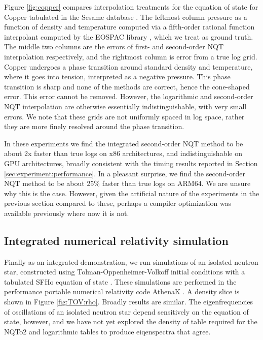 \documentclass[linenumbers,twocolumn]{aastex631}
\newcommand{\mynote}[3]{
  \textcolor{#2}{\fbox{\bfseries\sffamily\scriptsize#1}}
    {\small$\blacktriangleright$\textsf{\emph{#3}}$\blacktriangleleft$}
}
\newcommand{\jf}[1]{\mynote{JF}{green}{#1}}
\newcommand{\jmm}[1]{\mynote{JMM}{blue}{#1}}
\begin{document}
Figure \ref{fig:copper} compares interpolation treatments for the equation of state for Copper tabulated in the Sesame database \citep{sesame,Peterson2012CopperEOS}. The leftmost column pressure as a function of density and temperature computed via a fifth-order rational function interpolant computed by the EOSPAC library \citep{PimentelDavidA2021EUMV}, which we treat as ground truth. The middle two columns are the errors of first- and second-order NQT interpolation respectively, and the rightmost column is error from a true log grid. Copper undergoes a phase transition around standard density and temperature, where it goes into tension, interpreted as a negative pressure. This phase transition is sharp and none of the methods are correct, hence the cone-shaped error. This error cannot be removed. However, the logarithmic and second-order NQT interpolation are otherwise essentially indistinguishable, with very small errors. We note that these grids are not uniformly spaced in log space, rather they are more finely resolved around the phase transition.

In these experiments we find the integrated second-order NQT method to be about 2x faster than true logs on x86 architectures, and indistinguishable on GPU architectures, broadly consistent with the timing results reported in Section \ref{sec:experiment:performance}. In a pleasant surprise, we find the second-order NQT method to be about 25\% faster than true logs on ARM64. We are unsure why this is the case. However, given the artificial nature of the experiments in the previous section compared to these, perhaps a compiler optimization was available previously where now it is not.

\subsection{Integrated numerical relativity simulation}
\label{sec:experiment:integrated}

Finally as an integrated demonstration, we run simulations of an isolated neutron star, constructed using Tolman-Oppenheimer-Volkoff initial conditions \citep{Tolman1, Tolman2, TOV3} with a tabulated SFHo equation of state \citep{SFHoEOS}. These simulations are performed in the performance portable numerical relativity code AthenaK \citep{StoneAthenaKBase, Zhu24AthenaKNR, Fields24BNS}. A density slice is shown in Figure \ref{fig:TOV:rho}. Broadly results are similar. The eigenfrequencies of oscillations of an isolated neutron star depend sensitively on the equation of state, however, and we have not yet explored the density of table required for the NQTo2 and logarithmic tables to produce eiqenspectra that agree. 
\end{document}
